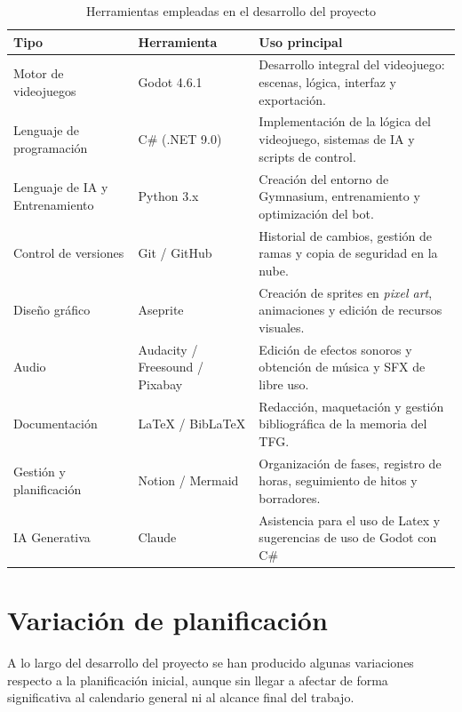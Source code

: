 \clearpage

\begin{table}[h!]
	\centering
	\begin{tabularx}{\textwidth}{|
			>{\centering\arraybackslash}X|
			>{\centering\arraybackslash}X|
			>{\centering\arraybackslash}p{8cm}|}
		\hline
		\textbf{Tipo} & \textbf{Herramienta} & \textbf{Uso principal} \\
		\hline
		Motor de videojuegos & Godot 4.6.1 & Desarrollo integral del videojuego: escenas, lógica, interfaz y exportación. \\
		\hline
		Lenguaje de programación & C\# (.NET 9.0) & Implementación de la lógica del videojuego, sistemas de IA y scripts de control. \\
		\hline
		Lenguaje de IA y Entrenamiento & Python 3.x & Creación del entorno de Gymnasium, entrenamiento y optimización del bot. \\
		\hline
		Control de versiones & Git / GitHub & Historial de cambios, gestión de ramas y copia de seguridad en la nube. \\
		\hline
		Diseño gráfico & Aseprite & Creación de sprites en \textit{pixel art}, animaciones y edición de recursos visuales. \\
		\hline
		Audio & Audacity / Freesound / Pixabay & Edición de efectos sonoros y obtención de música y SFX de libre uso. \\
		\hline
		Documentación & \LaTeX{} / Bib\LaTeX & Redacción, maquetación y gestión bibliográfica de la memoria del TFG. \\
		\hline
		Gestión y planificación & Notion / Mermaid & Organización de fases, registro de horas, seguimiento de hitos y borradores. \\
		\hline
		IA Generativa & Claude & Asistencia para el uso de Latex y sugerencias de uso de Godot con C\# \\
		\hline
	\end{tabularx}
	\caption{Herramientas empleadas en el desarrollo del proyecto}
	\label{tab:Herramientas}
\end{table}

\section{Variación de planificación}

A lo largo del desarrollo del proyecto se han producido algunas variaciones respecto a la planificación inicial, aunque sin llegar a afectar de forma significativa al calendario general ni al alcance final del trabajo.

